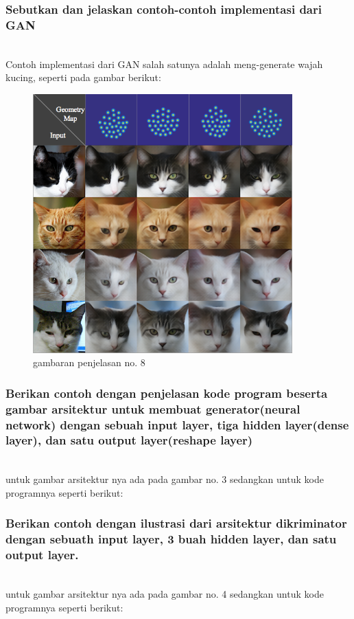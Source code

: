 \subsubsection{Sebutkan dan jelaskan contoh-contoh implementasi dari GAN}
\hfill\\
Contoh implementasi dari GAN salah satunya adalah meng-generate wajah kucing, seperti pada gambar berikut:

\begin{figure}[H]
	\centering
	\includegraphics[width=10cm]{figures/1174083/figures8/8.png}
	\caption{gambaran penjelasan no. 8}
\end{figure}

\subsubsection{Berikan contoh dengan penjelasan kode program beserta gambar arsitektur untuk membuat generator(neural network) dengan sebuah input layer, tiga hidden layer(dense layer), dan satu output layer(reshape layer)}
\hfill\\
untuk gambar arsitektur nya ada pada gambar no. 3 sedangkan untuk kode programnya seperti berikut:


\subsubsection{Berikan contoh dengan ilustrasi dari arsitektur dikriminator dengan sebuath input layer, 3 buah hidden layer, dan satu output layer.}
\hfill\\
untuk gambar arsitektur nya ada pada gambar no. 4 sedangkan untuk kode programnya seperti berikut:



